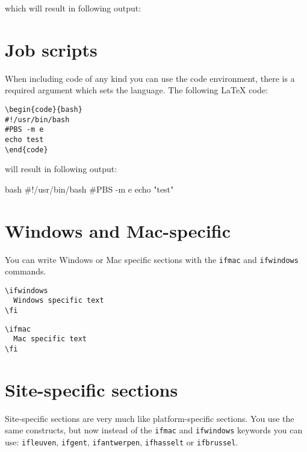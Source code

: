 \documentclass[11pt,a4paper]{article}
\begin{document}
which will result in following output:

\section{Job scripts}
\label{sec:job-scripts}

When including code of any kind you can use the code environment, there is a
required argument which sets the language. The following LaTeX code:

\begin{verbatim}
\begin{code}{bash}
#!/usr/bin/bash
#PBS -m e
echo test
\end{code}
\end{verbatim}

will result in following output:

\begin{code}{bash}
#!/usr/bin/bash
#PBS -m e
echo "test"
\end{code}

\section{Windows and Mac-specific}
\label{sec:windows-and-mac-specific}

You can write Windows or Mac specific sections with the \texttt{ifmac} and
\texttt{ifwindows} commands.

\begin{verbatim}
\ifwindows
  Windows specific text
\fi
\end{verbatim}

\begin{verbatim}
\ifmac
  Mac specific text
\fi
\end{verbatim}


\section{Site-specific sections}
\label{sec:site-specific-sections}

Site-specific sections are very much like platform-specific sections. You use
the same constructs, but now instead of the \texttt{ifmac} and \texttt{ifwindows}
keywords you can use: \texttt{ifleuven}, \texttt{ifgent}, \texttt{ifantwerpen},
\texttt{ifhasselt} or \texttt{ifbrussel}.
\end{document}
